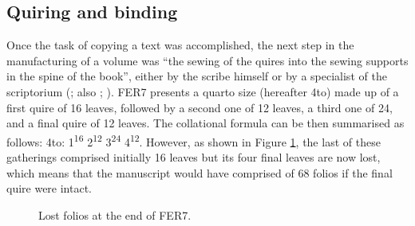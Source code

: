\begin{paper}
\subsection{Quiring and binding}

Once the task of copying a text was accomplished, the next step in the
manufacturing of a volume was ``the sewing of the quires into the sewing
supports in the spine of the book'', either by the scribe himself or by
a specialist of the scriptorium (\cite[285]{romero-barranco_early_2017}; also \cite[6]{petti_english_1977}; \cite[49]{clemens_introduction_2007}). FER7 presents a quarto size
(hereafter 4to) made up of a first quire of 16 leaves, followed by a
second one of 12 leaves, a third one of 24, and a final quire of 12
leaves. The collational formula can be then summarised as follows: 4to:
1\textsuperscript{16} 2\textsuperscript{12} 3\textsuperscript{24}
4\textsuperscript{12}. However, as shown in Figure \ref{fig:lorente6}, the last of these
gatherings comprised initially 16 leaves but its four final leaves are
now lost, which means that the manuscript would have comprised of 68 folios
if the final quire were intact.

\begin{figure}[H]
    \centering
    \caption{Lost folios at the end of FER7.}
    \label{fig:lorente6}
\end{figure}

\vfill


\end{paper}

